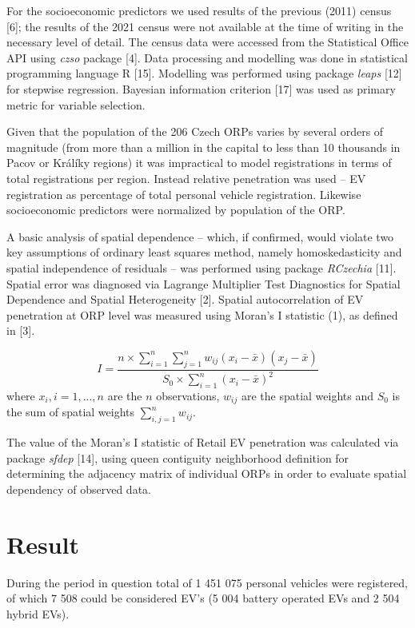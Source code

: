\documentclass{mmeproc}
\begin{document}
For the socioeconomic predictors we used results of the previous (2011)
census {[}6{]}; the results of the 2021 census were not available at
the time of writing in the necessary level of detail. The census data
were accessed from the Statistical Office API using \emph{czso} package
{[}4{]}. Data processing and modelling was done in statistical
programming language R {[}15{]}. Modelling was performed using package
\emph{leaps} {[}12{]} for stepwise regression. Bayesian information
criterion {[}17{]} was used as primary metric for variable selection.

Given that the population of the 206 Czech ORPs varies by several orders
of magnitude (from more than a million in the capital to less than 10
thousands in Pacov or Králíky regions) it was impractical to model
registrations in terms of total registrations per region. Instead
relative penetration was used -- EV registration as percentage of total
personal vehicle registration. Likewise socioeconomic predictors were
normalized by population of the ORP.

A basic analysis of spatial dependence -- which, if confirmed, would
violate two key assumptions of ordinary least squares method, namely
homoskedasticity and spatial independence of residuals -- was performed
using package \emph{RCzechia} {[}11{]}. Spatial error was diagnosed via
Lagrange Multiplier Test Diagnostics for Spatial Dependence and Spatial
Heterogeneity {[}2{]}. Spatial autocorrelation of EV penetration at ORP
level was measured using Moran's I statistic (1), as defined in {[}3{]}.

\[
I = \frac{n \times \sum_{i=1}^n\sum_{j=1}^n w_{ij}(x_i - \bar{x})(x_j - \bar{x})}{S_0 \times \sum_{i=1}^n (x_i - \bar{x})^2} \tag{1}
\]
where \(x_i, i = 1, ..., n\) are the \(n\) observations, \(w_{ij}\)
are the spatial weights and \(S_0\) is the sum of spatial weights
\(\sum_{i, j=1}^n w_{ij}\).

The value of the Moran's I statistic of Retail EV penetration was
calculated via package \emph{sfdep} {[}14{]}, using queen contiguity
neighborhood definition for determining the adjacency matrix of
individual ORPs in order to evaluate spatial dependency of observed
data.

\hypertarget{result}{%
\section{Result}\label{result}}

During the period in question total of 1 451 075 personal vehicles were
registered, of which 7 508 could be considered EV's (5 004 battery
operated EVs and 2 504 hybrid EVs).
\end{document}
